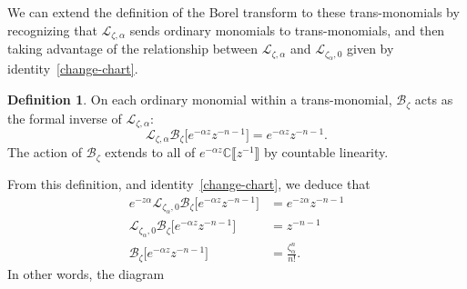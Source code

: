 \documentclass{article}
\newcommand{\maps}{\colon}
\newcommand{\C}{\mathbb{C}}
\newcommand{\laplace}{\mathcal{L}}
\newcommand{\borel}{\mathcal{B}}
\theoremstyle{definition}
\newtheorem{definition}{Definition}[section]
\theoremstyle{plain}
\newtheorem{lemma}[definition]{Lemma}
\begin{document}
We can extend the definition of the Borel transform to these trans-monomials by recognizing that $\laplace_{\zeta, \alpha}$ sends ordinary monomials to trans-monomials, and then taking advantage of the relationship between $\laplace_{\zeta, \alpha}$ and $\laplace_{\zeta_\alpha, 0}$ given by identity~\eqref{change-chart}.
\begin{definition}
On each ordinary monomial within a trans-monomial, $\borel_\zeta$ acts as the formal inverse of $\laplace_{\zeta,\alpha}$:
\[\laplace_{\zeta,\alpha}\borel_\zeta\big[e^{-\alpha z} z^{-n-1} \big]=e^{-\alpha z} z^{-n-1}. \]
The action of $\borel_\zeta$ extends to all of $e^{-\alpha z} \C\llbracket z^{-1} \rrbracket$ by countable linearity.
\end{definition}
From this definition, and identity~\eqref{change-chart}, we deduce that
\begin{align*}
e^{-z\alpha}\laplace_{\zeta_\alpha,0}\borel_\zeta\big[e^{-\alpha z} z^{-n-1}\big] & = e^{-z\alpha} z^{-n-1} \\
\laplace_{\zeta_\alpha,0}\borel_\zeta\big[e^{-\alpha z} z^{-n-1}\big] & = z^{-n-1} \\
\borel_{\zeta}\big[e^{-\alpha z}z^{-n-1}\big] & = \frac{\zeta_\alpha^n}{n!}.
\end{align*}
%
In other words, the diagram 
\begin{center}
\end{center}
\end{document}
